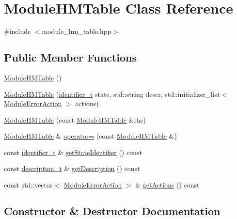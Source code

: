 \hypertarget{classModuleHMTable}{}\section{Module\+H\+M\+Table Class Reference}
\label{classModuleHMTable}


{\ttfamily \#include $<$module\+\_\+hm\+\_\+table.\+hpp$>$}

\subsection*{Public Member Functions}
\begin{DoxyCompactItemize}
\item 
\hyperlink{classModuleHMTable_a8be2651642ef442f85b4a11ff958b508}{Module\+H\+M\+Table} ()
\item 
\hyperlink{classModuleHMTable_a98df90365108a6510f6776848cac2886}{Module\+H\+M\+Table} (\hyperlink{general__types_8hpp_a824b78b06da8112c2772bc666a63638d}{identifier\+\_\+t} state, std\+::string descr, std\+::initializer\+\_\+list$<$ \hyperlink{classModuleErrorAction}{Module\+Error\+Action} $>$ actions)
\item 
\hyperlink{classModuleHMTable_afc0680ba8a0f38568c357c2f5bb5d36b}{Module\+H\+M\+Table} (const \hyperlink{classModuleHMTable}{Module\+H\+M\+Table} \&rhs)
\item 
\hyperlink{classModuleHMTable}{Module\+H\+M\+Table} \& \hyperlink{classModuleHMTable_adfc368ea0e0558035f51c8b1b129bc89}{operator=} (const \hyperlink{classModuleHMTable}{Module\+H\+M\+Table} \&)
\item 
const \hyperlink{general__types_8hpp_a824b78b06da8112c2772bc666a63638d}{identifier\+\_\+t} \& \hyperlink{classModuleHMTable_a33e875e1bbed695ae0b2876bf39ca31a}{get\+State\+Identifier} () const 
\item 
const \hyperlink{general__types_8hpp_a04620533c87d7c21b135716733d66a64}{description\+\_\+t} \& \hyperlink{classModuleHMTable_afd0ebe6fb0bf13e91aeaca8e1b4597f4}{get\+Description} () const 
\item 
const std\+::vector$<$ \hyperlink{classModuleErrorAction}{Module\+Error\+Action} $>$ \& \hyperlink{classModuleHMTable_a40dec45357543d1530fcfedfafbe3104}{get\+Actions} () const 
\end{DoxyCompactItemize}


\subsection{Constructor \& Destructor Documentation}
